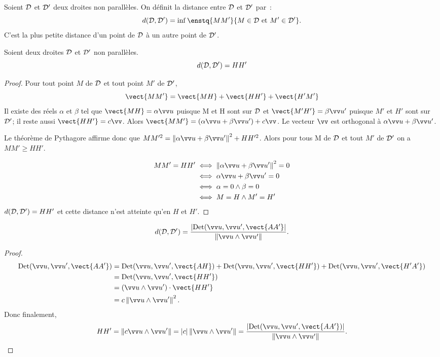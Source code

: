 \begin{defdef}
  Soient $\mathcal{D}$ et $\mathcal{D}'$ deux droites non parallèles. On définit la distance entre $\mathcal{D}$ et $\mathcal{D}'$ par~:
  \begin{equation}
    d(\Dr,\Dr')=\inf\enstq{MM'}{M \in \Dr \text{~et~} M'\in \Dr'}.
  \end{equation}
C'est la plus petite distance d'un point de $\mathcal{D}$ à un autre point de $\mathcal{D}'$.
\end{defdef}
\begin{prop}
  Soient deux droites $\mathcal{D}$ et $\mathcal{D}'$ non parallèles.
  \begin{equation}
    d(\mathcal{D},\mathcal{D}')=HH'
  \end{equation}
\end{prop}
\begin{proof}
  Pour tout point $M$ de $\mathcal{D}$ et tout point $M'$ de $\mathcal{D}'$, 
  \begin{equation}
    \vect{MM'}=\vect{MH}+\vect{HH'}+\vect{H'M'}
  \end{equation}
Il existe des réels $\alpha$ et $\beta$ tel que $\vect{MH}=\alpha\vu$ puisque M et H sont sur $\mathcal{D}$ et $\vect{M'H'}=\beta\vu'$ puisque $M'$ et $H'$ sont sur $\mathcal{D}'$; il reste aussi $\vect{HH'}=c\vv$. Alors $\vect{MM'}=(\alpha\vu+\beta\vu')+c\vv$. Le vecteur $\vv$ est orthogonal à $\alpha\vu+\beta\vu'$.

Le théorème de Pythagore affirme donc que $MM'^2=\norme{\alpha\vu+\beta\vu'}^2+HH'^2$. Alors pour tous M de $\mathcal{D}$ et tout $M'$ de $\mathcal{D}'$ on a $MM'\geq HH'$.

\begin{align}
  MM'=HH' &\iff \norme{\alpha\vu+\beta\vu'}^2=0\\
&\iff \alpha\vu+\beta\vu'=0\\
&\iff \alpha=0 \wedge \beta=0\\
&\iff M=H \wedge M'=H'
\end{align}
$d(\mathcal{D},\mathcal{D}')=HH'$ et cette distance n'est atteinte qu'en $H$ et $H'$.
\end{proof}
\begin{prop}
  \begin{equation}
    d(\Dr,\Dr')=\frac{\abs{\Det(\vu,\vu',\vect{AA'}}}{\norme{\vu\wedge\vu'}}.
  \end{equation}
\end{prop}
\begin{proof}
  \begin{align}
    \Det(\vu,\vu',\vect{AA'})&=\Det(\vu,\vu',\vect{AH})+\Det(\vu,\vu',\vect{HH'})+\Det(\vu,\vu',\vect{H'A'})\\
    &=\Det(\vu,\vu',\vect{HH'})\\
    &=(\vu\wedge\vu')\cdot\vect{HH'}\\
    &=c\norme{\vu\wedge\vu'}^2.
  \end{align}
  Donc finalement, 
  \begin{equation}
    HH'=\norme{c\vu\wedge\vu'}=\abs{c}\norme{\vu\wedge\vu'}=\frac{\abs{\Det(\vu,\vu',\vect{AA'})}}{\norme{\vu\wedge\vu'}}.
  \end{equation}
\end{proof}

